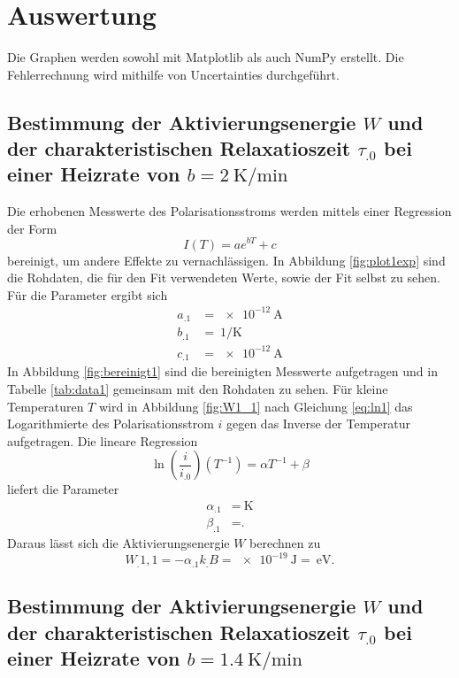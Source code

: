 \section{Auswertung}
\label{sec:Auswertung}

Die Graphen werden sowohl mit Matplotlib \cite{matplotlib} als auch NumPy \cite{numpy} erstellt. Die Fehlerrechnung wird mithilfe von Uncertainties \cite{uncertainties} durchgeführt.

\subsection{Bestimmung der Aktivierungsenergie $W$ und der charakteristischen Relaxatioszeit $\tau_.0$ bei einer Heizrate von $b=\SI{2}{\kelvin\per\minute}$}

Die erhobenen Messwerte des Polarisationsstroms werden mittels einer Regression der Form
\[
I(T)=a e^{b T}+c
\]
bereinigt, um andere Effekte zu vernachlässigen. In Abbildung \ref{fig:plot1exp} sind die Rohdaten, die für den Fit verwendeten Werte, sowie der Fit selbst zu sehen.\\
Für die Parameter ergibt sich
\begin{align*}
a_.1&=\SI{e-12}{\ampere}\\
b_.1&=\SI{}{1\per\kelvin}\\
c_.1&=\SI{e-12}{\ampere}
\end{align*}
In Abbildung \ref{fig:bereinigt1} sind die bereinigten Messwerte aufgetragen und in Tabelle \ref{tab:data1} gemeinsam mit den Rohdaten zu sehen.
Für kleine Temperaturen $T$ wird in Abbildung \ref{fig:W1_1} nach Gleichung \eqref{eq:ln1} das Logarithmierte des Polarisationsstrom $i$ gegen das Inverse der Temperatur aufgetragen.
Die lineare Regression
\[
\ln\left(\frac{i}{i_.0}\right)(T^{-1})=\alpha T^{-1}+\beta
\]
liefert die Parameter
\begin{align*}
\alpha_.1&=\SI{}{\kelvin}\\
\beta_.1&= \text{.}
\end{align*}
Daraus lässt sich die Aktivierungsenergie $W$ berechnen zu
\[
W_.{1,1} = -\alpha_.1 k_.B =\SI{e-19}{\joule}=\SI{}{\electronvolt}\text{.}
\]

\subsection{Bestimmung der Aktivierungsenergie $W$ und der charakteristischen Relaxatioszeit $\tau_.0$ bei einer Heizrate von $b=\SI{1,4}{\kelvin\per\minute}$}

